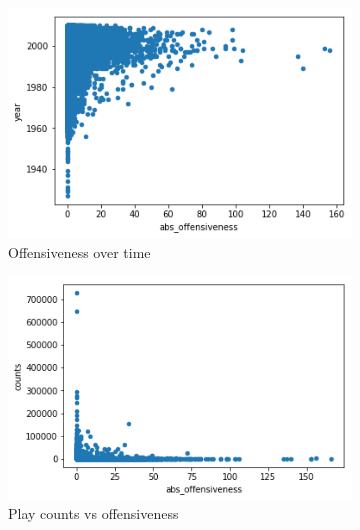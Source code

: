 \documentclass[11pt]{article}
\begin{document}
\begin{figure}
\begin{subfigure}[b]{0.45\textwidth}
\centering
\includegraphics[width=\textwidth]{plots/scatter_off_time}
\caption{Offensiveness over time}
\label{scatter_off_time}
\end{subfigure}
\quad
\begin{subfigure}[b]{0.45\textwidth}
\centering
\includegraphics[width=\textwidth]{plots/scatter_off_counts}
\caption{Play counts vs offensiveness}
\label{scatter_off_counts}
\end{subfigure}

\centering
\begin{subfigure}[b]{0.45\textwidth}
\centering


\end{subfigure}
\end{figure}
\end{document}
